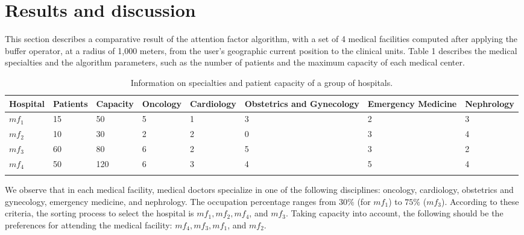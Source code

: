 \documentclass[sustainability,article,submit,pdftex,moreauthors]{Definitions/mdpi}
\begin{document}
\section{Results and discussion}



This section describes a comparative result of the attention factor algorithm, with a set of 4 medical facilities computed after applying the buffer operator, at a radius of 1,000 meters, from the user's geographic current position to the clinical units. Table 1 describes the medical specialties and the algorithm parameters, such as the number of patients and the maximum capacity of each medical center.

\begin{table}[H] 
\caption{Information on specialties and patient capacity of a group of hospitals.\label{table_hospital_info}}
\begin{tabularx}{\textwidth}{CCCCCCCC}
\toprule
\textbf{Hospital} & \textbf{Patients} & \textbf{Capacity} & \textbf{Oncology} & \textbf{Cardiology} & \textbf{Obstetrics and Gynecology} & \textbf{Emergency Medicine} & \textbf{Nephrology} \\
\midrule
$mf_{1}$ & 15 & 50  & 5 & 1 & 3 & 2 & 3 \\
$mf_{2}$ & 10 & 30  & 2 & 2 & 0 & 3 & 4 \\
$mf_{3}$ & 60 & 80  & 6 & 2 & 5 & 3 & 2 \\
$mf_{4}$ & 50 & 120 & 6 & 3 & 4 & 5 & 4 \\ 
\bottomrule \\
\end{tabularx}
\end{table}
\unskip

{We observe that in each medical facility, medical doctors specialize in one of the following disciplines: oncology, cardiology, obstetrics and gynecology, emergency medicine, and nephrology. The occupation percentage ranges from $30\%$ (for $mf_1$) to $75\%$ ($mf_3$). According to these criteria, the sorting process to select the hospital is $mf_1, mf_2, mf_4$, and $mf_3$. Taking capacity into account, the following should be the preferences for attending the medical facility: $mf_4, mf_3, mf_1$, and $mf_2$.}
\end{document}
